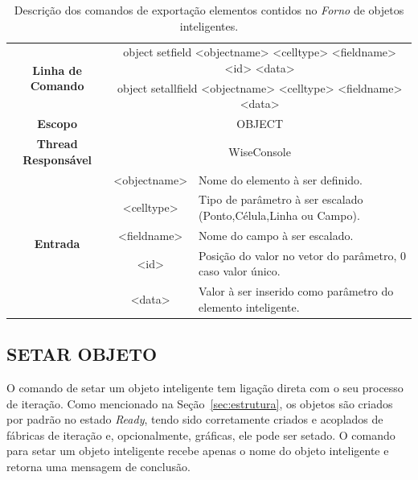 \documentclass[a4paper,12pt]{monografia}
\theoremstyle{plain}
\theoremstyle{definition}
\theoremstyle{remark}
\begin{document}
\begin{center}
	\begin{table}[!htbp]
		\begin{tabular}{|c|c|m{}|}
			\hline
			\multirow{2}{*}{\textbf{Linha de Comando}} & \multicolumn{2}{c|}{object set\underline{\space\space}field <object\underline{\space\space}name> <cell\underline{\space\space}type> <field\underline{\space\space}name> <id> <data>} \\
			& \multicolumn{2}{c|}{object set\underline{\space\space}all\underline{\space\space}field <object\underline{\space\space}name> <cell\underline{\space\space}type> <field\underline{\space\space}name> <data>} \\
			\hline
			\textbf{Escopo} & \multicolumn{2}{c|}{OBJECT} \\
			\hline
			\textbf{Thread Responsável} & \multicolumn{2}{c|}{WiseConsole} \\
			\hline
			\multirow{5}{*}{\textbf{Entrada}} & <object\underline{\space\space}name> & Nome do elemento à ser definido. \\
			& <cell\underline{\space\space}type> & Tipo de parâmetro à ser escalado (Ponto,Célula,Linha ou Campo). \\
			& <field\underline{\space\space}name> & Nome do campo à ser escalado. \\
			& <id> & Posição do valor no vetor do parâmetro, 0 caso valor único. \\
			& <data> & Valor à ser inserido como parâmetro do elemento inteligente. \\
			\hline
		\end{tabular}
		\caption{Descrição dos comandos de exportação elementos contidos no \textit{Forno} de objetos inteligentes.}
		\label{tab:set_field_object}
	\end{table}
\end{center}

\subsection{SETAR OBJETO}\label{sec:set_object}

O comando de setar um objeto inteligente tem ligação direta com o seu processo de iteração. Como mencionado na Seção~\ref{sec:estrutura}, os objetos são criados por padrão no estado \textit{Ready}, tendo sido corretamente criados e acoplados de fábricas de iteração e, opcionalmente, gráficas, ele pode ser setado. O comando para setar um objeto inteligente recebe apenas o nome do objeto inteligente e retorna uma mensagem de conclusão.
\end{document}
